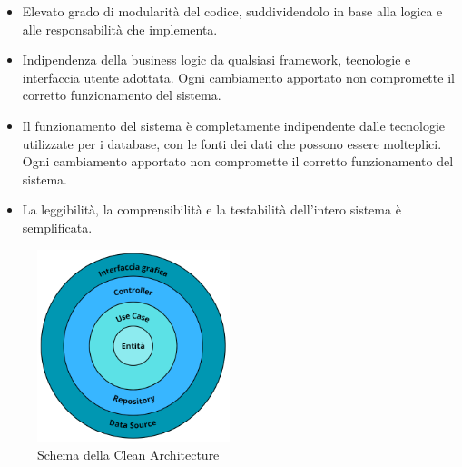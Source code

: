 \begin{itemize}
    \item Elevato grado di modularità del codice, suddividendolo in base alla logica e alle responsabilità che implementa.
    \item Indipendenza della business logic da qualsiasi framework, tecnologie e interfaccia utente adottata. Ogni cambiamento apportato non compromette il corretto funzionamento del sistema.
    \item Il funzionamento del sistema è completamente indipendente dalle tecnologie utilizzate per i database, con le fonti dei dati che possono essere molteplici. Ogni cambiamento apportato non compromette il corretto funzionamento del sistema.
    \item La leggibilità, la comprensibilità e la testabilità dell'intero sistema è semplificata.
\end{itemize}

\begin{figure}[h!]
    \centering  
    \includegraphics[width=0.5\textwidth]{cleanarch.png}
    \caption{Schema della Clean Architecture}
\end{figure}

\newpage

